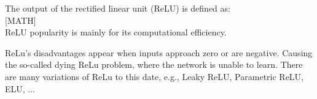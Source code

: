 
The output of the rectified linear unit (ReLU) is defined as:\\

[MATH]\\

ReLU popularity is mainly for its computational efficiency.\cite{7typesactivationfunctions}

ReLu's disadvantages appear when inputs approach zero or are negative. Causing the so-called dying ReLu problem, where the network is unable to learn.
There are many variations of ReLu to this date, e.g., Leaky ReLU, Parametric ReLU, ELU, ... 